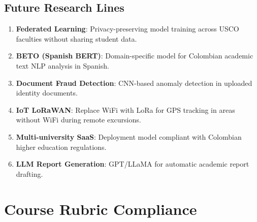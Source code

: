 \documentclass[12pt,a4paper,twoside]{report}
\begin{document}
\section{Future Research Lines}
\begin{enumerate}[leftmargin=*]
\item \textbf{Federated Learning}: Privacy-preserving model training across USCO faculties without sharing student data.
\item \textbf{BETO (Spanish BERT)}: Domain-specific model for Colombian academic text NLP analysis in Spanish.
\item \textbf{Document Fraud Detection}: CNN-based anomaly detection in uploaded identity documents.
\item \textbf{IoT LoRaWAN}: Replace WiFi with LoRa for GPS tracking in areas without WiFi during remote excursions.
\item \textbf{Multi-university SaaS}: Deployment model compliant with Colombian higher education regulations.
\item \textbf{LLM Report Generation}: GPT/LLaMA for automatic academic report drafting.
\end{enumerate}

\chapter*{Course Rubric Compliance}
\end{document}

